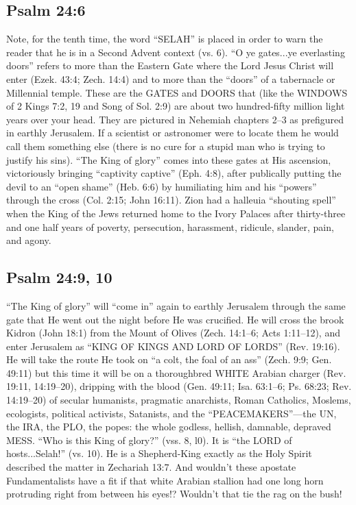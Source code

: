 \subsection{Psalm 24:6}

Note, for the tenth time, the word “SELAH” is placed in order to warn the reader that he is in a Second Advent context (vs. 6). “O ye gates...ye everlasting doors” refers to more than the Eastern Gate where the Lord Jesus Christ will enter (Ezek. 43:4; Zech. 14:4) and to more than the “doors” of a tabernacle or Millennial temple. These are the GATES and DOORS that (like the WINDOWS of 2 Kings 7:2, 19 and Song of Sol. 2:9) are about two hundred-fifty million light years over your head. They are pictured in Nehemiah chapters 2--3 as prefigured in earthly Jerusalem. If a scientist or astronomer were to locate them he would call them something else (there is no cure for a stupid man who is trying to justify his sins). “The King of glory” comes into these gates at His ascension, victoriously bringing “captivity captive” (Eph. 4:8), after publically putting the devil to an “open shame” (Heb. 6:6) by humiliating him and his “powers” through the cross (Col. 2:15; John 16:11). Zion had a halleuia “shouting spell” when the King of the Jews returned home to the Ivory Palaces after thirty-three and one half years of poverty, persecution, harassment, ridicule, slander, pain, and agony.

\subsection{Psalm 24:9, 10}
“The King of glory” will “come in” again to earthly Jerusalem through the same gate that He went out the night before He was crucified. He will cross the brook Kidron (John 18:1) from the Mount of Olives (Zech. 14:1–6; Acts 1:11–12), and enter Jerusalem as “KING OF KINGS AND LORD OF LORDS” (Rev. 19:16). He will take the route He took on ``a colt, the foal of an ass'' (Zech. 9:9; Gen. 49:11) but this time it will be on a thoroughbred WHITE Arabian charger (Rev. 19:11, 14:19–20), dripping with the blood (Gen. 49:11; Isa. 63:1–6; Ps. 68:23; Rev. 14:19–20) of secular humanists, pragmatic anarchists, Roman Catholics, Moslems, ecologists, political activists, Satanists, and the “PEACEMAKERS”—the UN, the IRA, the PLO, the popes: the whole godless, hellish, damnable, depraved MESS. “Who is this King of glory?” (vss. 8, l0). It is “the LORD of hosts...Selah!” (vs. 10). He is a Shepherd-King exactly as the Holy Spirit described the matter in Zechariah 13:7. And wouldn’t these apostate Fundamentalists have a fit if that white Arabian stallion had one long horn protruding right from between his eyes!? Wouldn’t that tie the rag on the bush!